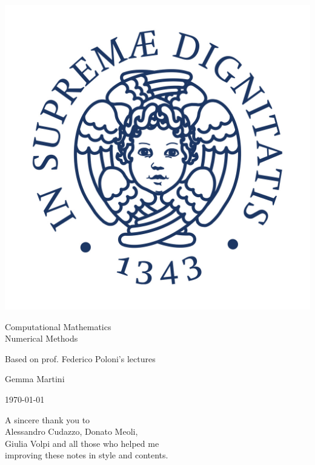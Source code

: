 \documentclass[ComputationalMathematics.tex]{subfiles}
\begin{document}
\begin{titlepage}
    \begin{center}
    \vspace{3cm}
    
    \Large
    
    \vspace{2cm}
    
    \includegraphics[scale=0.3]{pics/cherubino.jpg}
    
    \vspace{2.5cm}
    
    {\Huge \sc Computational Mathematics\\ Numerical Methods}
    
    \vspace{2cm}
    Based on prof. Federico Poloni's lectures
    
    \vspace{2cm}
    Gemma Martini
    \vfill
    
    \today
    
    \end{center}
\end{titlepage}


\phantom{pippo}
\vspace{5cm}
\begin{flushleft}
A sincere thank you to\\
Alessandro Cudazzo, Donato Meoli,\\
Giulia Volpi and all those who helped me\\
improving these notes in style and contents.\\
\end{flushleft}
\newpage

\shipout\null

\tableofcontents
\let\tableofcontents\relax


\end{document}
